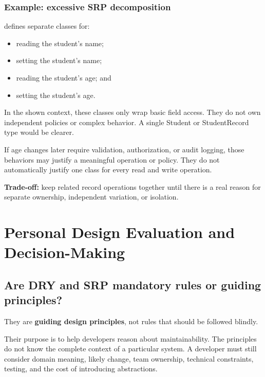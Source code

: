 \documentclass[12pt,a4paper]{article}
\begin{document}
\subsubsection{Example: excessive SRP decomposition}

 defines separate classes for:

\begin{itemize}

\item reading the student's name;

\item setting the student's name;

\item reading the student's age; and

\item setting the student's age.

\end{itemize}

In the shown context, these classes only wrap basic field access. They do not own independent policies or complex behavior. A single Student or StudentRecord type would be clearer.

If age changes later require validation, authorization, or audit logging, those behaviors may justify a meaningful operation or policy. They do not automatically justify one class for every read and write operation.

\textbf{Trade-off:} keep related record operations together until there is a real reason for separate ownership, independent variation, or isolation.

\section{Personal Design Evaluation and Decision-Making}

\subsection{Are DRY and SRP mandatory rules or guiding principles?}

They are \textbf{guiding design principles}, not rules that should be followed blindly.

Their purpose is to help developers reason about maintainability. The principles do not know the complete context of a particular system. A developer must still consider domain meaning, likely change, team ownership, technical constraints, testing, and the cost of introducing abstractions.
\end{document}
